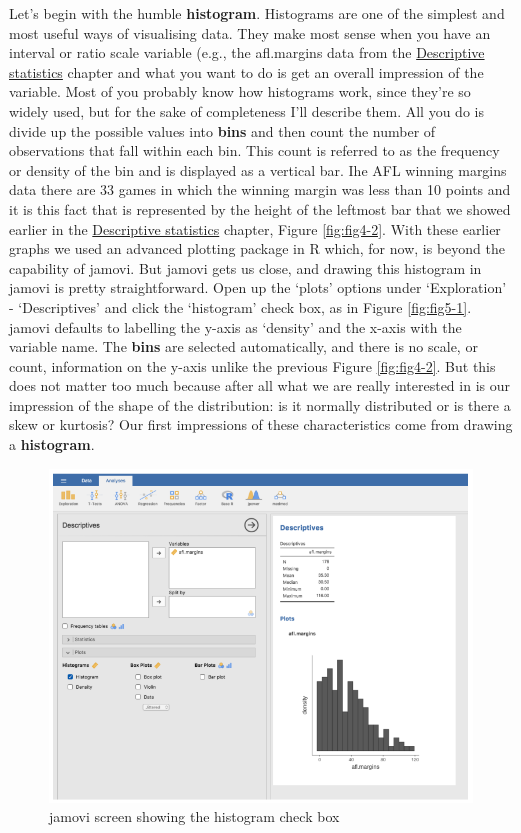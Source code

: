 \documentclass[
]{book}
\begin{document}
Let's begin with the humble \textbf{histogram}. Histograms are one of the simplest and most useful ways of visualising data. They make most sense when you have an interval or ratio scale variable (e.g., the afl.margins data from the \protect\hyperlink{descriptive-statistics}{Descriptive statistics} chapter and what you want to do is get an overall impression of the variable. Most of you probably know how histograms work, since they're so widely used, but for the sake of completeness I'll describe them. All you do is divide up the possible values into \textbf{bins} and then count the number of observations that fall within each bin. This count is referred to as the frequency or density of the bin and is displayed as a vertical bar. Ihe AFL winning margins data there are 33 games in which the winning margin was less than 10 points and it is this fact that is represented by the height of the leftmost bar that we showed earlier in the \protect\hyperlink{descriptive-statistics}{Descriptive statistics} chapter, Figure \ref{fig:fig4-2}. With these earlier graphs we used an advanced plotting package in R which, for now, is beyond the capability of jamovi. But jamovi gets us close, and drawing this histogram in jamovi is pretty straightforward. Open up the `plots' options under `Exploration' - `Descriptives' and click the `histogram' check box, as in Figure \ref{fig:fig5-1}. jamovi defaults to labelling the y-axis as `density' and the x-axis with the variable name. The \textbf{bins} are selected automatically, and there is no scale, or count, information on the y-axis unlike the previous Figure \ref{fig:fig4-2}. But this does not matter too much because after all what we are really interested in is our impression of the shape of the distribution: is it normally distributed or is there a skew or kurtosis? Our first impressions of these characteristics come from drawing a \textbf{histogram}.

\begin{figure}
\includegraphics[width=0.9\linewidth]{images/Figure23} \caption{jamovi screen showing the histogram check box}\label{fig:fig5-2}
\end{figure}
\end{document}
